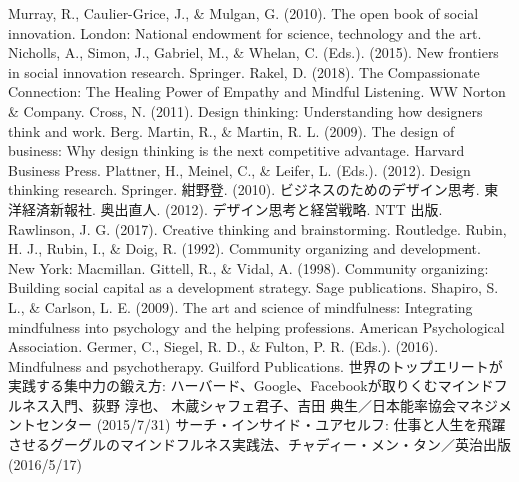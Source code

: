 \documentclass[dvipdfmx,11pt]{jsarticle}
\begin{document}
\begin{thebibliography}{99}
Murray, R., Caulier-Grice, J., \& Mulgan, G. (2010). The open book of social innovation. London: National endowment for science, technology and the art.
Nicholls, A., Simon, J., Gabriel, M., \& Whelan, C. (Eds.). (2015). New frontiers in social innovation research. Springer.
Rakel, D. (2018). The Compassionate Connection: The Healing Power of Empathy and Mindful Listening. WW Norton \& Company.
Cross, N. (2011). Design thinking: Understanding how designers think and work. Berg.
Martin, R., \& Martin, R. L. (2009). The design of business: Why design thinking is the next competitive advantage. Harvard Business Press.
Plattner, H., Meinel, C., \& Leifer, L. (Eds.). (2012). Design thinking research. Springer.
紺野登. (2010). ビジネスのためのデザイン思考. 東洋経済新報社.
奥出直人. (2012). デザイン思考と経営戦略. NTT 出版.
Rawlinson, J. G. (2017). Creative thinking and brainstorming. Routledge.
Rubin, H. J., Rubin, I., \& Doig, R. (1992). Community organizing and development. New York: Macmillan.
Gittell, R., \& Vidal, A. (1998). Community organizing: Building social capital as a development strategy. Sage publications.
Shapiro, S. L., \& Carlson, L. E. (2009). The art and science of mindfulness: Integrating mindfulness into psychology and the helping professions. American Psychological Association.
Germer, C., Siegel, R. D., \& Fulton, P. R. (Eds.). (2016). Mindfulness and psychotherapy. Guilford Publications.
世界のトップエリートが実践する集中力の鍛え方: ハーバード、Google、Facebookが取りくむマインドフルネス入門、荻野 淳也、 木蔵シャフェ君子、吉田 典生／日本能率協会マネジメントセンター (2015/7/31)
サーチ・インサイド・ユアセルフ: 仕事と人生を飛躍させるグーグルのマインドフルネス実践法、チャディー・メン・タン／英治出版 (2016/5/17)
\end{thebibliography}
\end{document}
